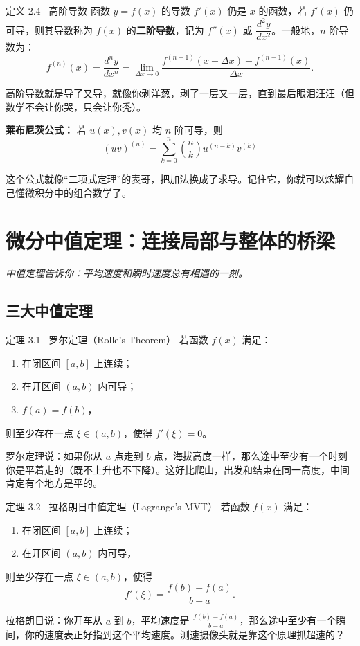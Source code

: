 \documentclass[12pt,a4paper]{article}
\newcommand{\humor}[1]{\par\smallskip\begin{humorbox}#1\end{humorbox}\smallskip}
\begin{document}
\begin{defbox}{定义 2.4 \ 高阶导数}
函数 $y = f(x)$ 的导数 $f'(x)$ 仍是 $x$ 的函数，若 $f'(x)$ 仍可导，则其导数称为 $f(x)$ 的\textbf{二阶导数}，记为 $f''(x)$ 或 $\dfrac{d^2y}{dx^2}$。一般地，$n$ 阶导数为：
\[
f^{(n)}(x) = \frac{d^n y}{dx^n} = \lim_{\Delta x \to 0} \frac{f^{(n-1)}(x+\Delta x) - f^{(n-1)}(x)}{\Delta x}.
\]
\end{defbox}
\humor{高阶导数就是导了又导，就像你剥洋葱，剥了一层又一层，直到最后眼泪汪汪（但数学不会让你哭，只会让你秃）。}

\begin{formulaframe}
\centering
\textbf{莱布尼茨公式：}
若 $u(x), v(x)$ 均 $n$ 阶可导，则
\[
(uv)^{(n)} = \sum_{k=0}^{n} \binom{n}{k} u^{(n-k)} v^{(k)}
\]
\end{formulaframe}
\humor{这个公式就像“二项式定理”的表哥，把加法换成了求导。记住它，你就可以炫耀自己懂微积分中的组合数学了。}

\newpage
\section{微分中值定理：连接局部与整体的桥梁}
\begin{center}\textcolor{Sunshine}{\itshape 中值定理告诉你：平均速度和瞬时速度总有相遇的一刻。}\end{center}

\subsection{三大中值定理}

\begin{thmbox}{定理 3.1 \ 罗尔定理（Rolle's Theorem）}
若函数 $f(x)$ 满足：
\begin{enumerate}[leftmargin=2em, itemsep=2pt]
  \item 在闭区间 $[a, b]$ 上连续；
  \item 在开区间 $(a, b)$ 内可导；
  \item $f(a) = f(b)$，
\end{enumerate}
则至少存在一点 $\xi \in (a, b)$，使得 $f'(\xi) = 0$。
\end{thmbox}
\humor{罗尔定理说：如果你从 $a$ 点走到 $b$ 点，海拔高度一样，那么途中至少有一个时刻你是平着走的（既不上升也不下降）。这好比爬山，出发和结束在同一高度，中间肯定有个地方是平的。}

\begin{thmbox}{定理 3.2 \ 拉格朗日中值定理（Lagrange's MVT）}
若函数 $f(x)$ 满足：
\begin{enumerate}[leftmargin=2em, itemsep=2pt]
  \item 在闭区间 $[a, b]$ 上连续；
  \item 在开区间 $(a, b)$ 内可导，
\end{enumerate}
则至少存在一点 $\xi \in (a, b)$，使得
\[
f'(\xi) = \frac{f(b) - f(a)}{b - a}.
\]
\end{thmbox}
\humor{拉格朗日说：你开车从 $a$ 到 $b$，平均速度是 $\frac{f(b)-f(a)}{b-a}$，那么途中至少有一个瞬间，你的速度表正好指到这个平均速度。测速摄像头就是靠这个原理抓超速的？}
\end{document}
